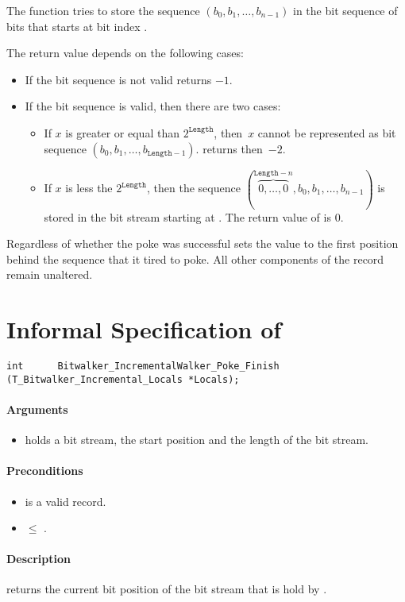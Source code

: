 The function \pokenext tries to store the sequence $(b_0, b_1,\ldots,b_{n - 1})$
in the bit sequence of  bits that starts
at bit index .

The return value depends on  the following cases:
\begin{itemize}
    \item  If the bit sequence is not valid \peeknext  returns $-1$.
    \item  If the bit sequence is valid, then there are two cases:
\begin{itemize}
\item
If $x$ is greater or equal than $2^\mathtt{Length}$, then~$x$
cannot be represented as bit sequence $(b_0, b_1,\ldots,b_{\mathtt{Length} - 1})$.
\pokenext returns then~$-2$.

\item
If $x$ is less the $2^{\mathtt{Length}}$, then  the sequence
$(\overbrace{0,\ldots,0}^{\mathtt{Length}-n},b_0, b_1,\ldots,b_{n - 1})$
is stored in the bit stream starting at .
The return value of \pokenext is 0.

\end{itemize}
\end{itemize}

Regardless of whether the poke was successful \pokenext sets the value   to the first position behind the sequence that it tired to poke.
 All other components of the record  remain unaltered.


\clearpage

\section{Informal Specification of }

\begin{lstlisting}[style=acsl-block]
int		 Bitwalker_IncrementalWalker_Poke_Finish (T_Bitwalker_Incremental_Locals *Locals);
\end{lstlisting}

\paragraph{Arguments}
\begin{itemize}
    \item  {} holds a bit stream, the start position and the length of the bit stream.
\end{itemize}

\paragraph{Preconditions}
\begin{itemize}
    \item  {} is a valid record.
    \item {} $\leq $ .
\end{itemize}

\paragraph{Description}

\peekfinish  returns the current bit position of the bit stream that is hold by .



